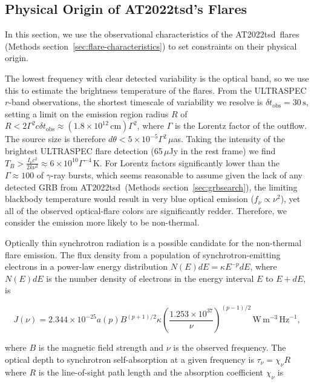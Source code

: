 \documentclass{nature_plusfigure}
\newcommand{\at}{AT2022tsd}
\begin{document}
\begin{methods}
\section{Physical Origin of \at's Flares}
\label{sec:flare-origin}

In this section, we use the observational characteristics of the \at\ flares (Methods section~\ref{sec:flare-characteristics}) to set constraints on their physical origin.

The lowest frequency with clear detected variability is the optical band, so we use this to estimate the brightness temperature of the flares.
From the ULTRASPEC $r$-band observations, the shortest timescale of variability we resolve is $\delta t_\mathrm{obs} = 30\,\mathrm{s}$, setting a limit on the emission region radius $R$ of\cite{Rybicki1986} $R<2\Gamma^2 c \delta t_\mathrm{obs} \approx (1.8\times10^{12}\,\mathrm{cm}) \Gamma^2$, where $\Gamma$ is the Lorentz factor of the outflow. 
The source size is therefore $d\theta < 5 \times 10^{-5} \Gamma^2 \,\mu$as. Taking the intensity of the brightest ULTRASPEC flare detection (65\,$\mu$Jy in the rest frame) we find $T_B > \frac{I_\nu c^2}{2 k\nu^2} \approx 6\times10^{10} \Gamma^{-4} \,$K.
For Lorentz factors significantly lower than the $\Gamma\approx100$ of $\gamma$-ray bursts, which seems reasonable to assume given the lack of any detected GRB from \at\ (Methods section~\ref{sec:grbsearch}), the limiting blackbody temperature would result in very blue optical emission ($f_\nu\propto\nu^2$), yet all of the observed optical-flare colors are significantly redder.
Therefore, we consider the emission more likely to be non-thermal.

Optically thin synchrotron radiation is a possible candidate for the non-thermal flare emission. The flux density from a population of synchrotron-emitting electrons in a power-law energy distribution $N(E)dE = \kappa E^{-p} dE$, where $N(E)dE$ is the number density of electrons in the energy interval $E$ to $E+dE$, is\cite{Longair2011}

\begin{equation}
\label{eq:synchrotron-flux}
J(\nu) = 2.344\times10^{-25} a(p) B^{(p+1)/2} \kappa \left( \frac{1.253\times10^{37}}{\nu} \right)^{(p-1)/2}\,\mathrm{W}\,\mathrm{m}^{-3}\,\mathrm{Hz}^{-1},
\end{equation}

\noindent where $B$ is the magnetic field strength and $\nu$ is the observed frequency. The optical depth to synchrotron self-absorption at a given frequency is $\tau_\nu = \chi_\nu R$ where $R$ is the line-of-sight path length and the absorption coefficient $\chi_\nu$ is


\end{methods}
\end{document}
